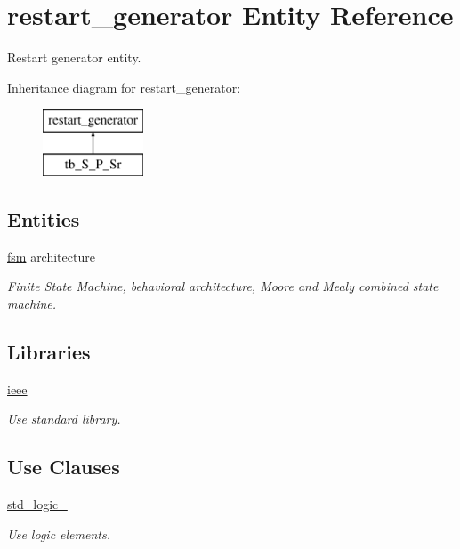 \hypertarget{classrestart__generator}{}\section{restart\+\_\+generator Entity Reference}
\label{classrestart__generator}


Restart generator entity.  


Inheritance diagram for restart\+\_\+generator\+:\begin{figure}[H]
\begin{center}
\leavevmode
\includegraphics[height=2.000000cm]{classrestart__generator}
\end{center}
\end{figure}
\subsection*{Entities}
\begin{DoxyCompactItemize}
\item 
\hyperlink{classrestart__generator_1_1fsm}{fsm} architecture
\begin{DoxyCompactList}\small\item\em Finite State Machine, behavioral architecture, Moore and Mealy combined state machine. \end{DoxyCompactList}\end{DoxyCompactItemize}
\subsection*{Libraries}
 \begin{DoxyCompactItemize}
\item 
\hyperlink{classrestart__generator_a0a6af6eef40212dbaf130d57ce711256}{ieee} 
\begin{DoxyCompactList}\small\item\em Use standard library. \end{DoxyCompactList}\end{DoxyCompactItemize}
\subsection*{Use Clauses}
 \begin{DoxyCompactItemize}
\item 
\hyperlink{classrestart__generator_acd03516902501cd1c7296a98e22c6fcb}{std\+\_\+logic\+\_}   
\begin{DoxyCompactList}\small\item\em Use logic elements. \end{DoxyCompactList}\end{DoxyCompactItemize}
